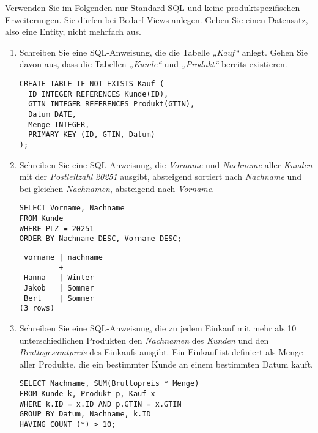 \documentclass{bschlangaul-aufgabe}
\begin{document}
Verwenden Sie im Folgenden nur Standard-SQL und keine
produktspezifischen Erweiterungen. Sie dürfen bei Bedarf Views anlegen.
Geben Sie einen Datensatz, also eine Entity, nicht mehrfach aus.

\begin{enumerate}


\item Schreiben Sie eine SQL-Anweisung, die die Tabelle \emph{„Kauf“}
anlegt. Gehen Sie davon aus, dass die Tabellen \emph{„Kunde“} und
\emph{„Produkt“} bereits existieren.

\begin{liAntwort}
\begin{verbatim}
CREATE TABLE IF NOT EXISTS Kauf (
  ID INTEGER REFERENCES Kunde(ID),
  GTIN INTEGER REFERENCES Produkt(GTIN),
  Datum DATE,
  Menge INTEGER,
  PRIMARY KEY (ID, GTIN, Datum)
);
\end{verbatim}
\end{liAntwort}


\item Schreiben Sie eine SQL-Anweisung, die \emph{Vorname} und
\emph{Nachname} aller \emph{Kunden} mit der \emph{Postleitzahl}
\emph{20251} ausgibt, absteigend sortiert nach \emph{Nachname} und bei
gleichen \emph{Nachnamen}, absteigend nach \emph{Vorname}.

\begin{liAntwort}
\begin{verbatim}
SELECT Vorname, Nachname
FROM Kunde
WHERE PLZ = 20251
ORDER BY Nachname DESC, Vorname DESC;
\end{verbatim}

\begin{verbatim}
 vorname | nachname
---------+----------
 Hanna   | Winter
 Jakob   | Sommer
 Bert    | Sommer
(3 rows)
\end{verbatim}
\end{liAntwort}


\item Schreiben Sie eine SQL-Anweisung, die zu jedem Einkauf mit mehr
als 10 unterschiedlichen Produkten den \emph{Nachnamen} des
\emph{Kunden} und den \emph{Bruttogesamtpreis} des Einkaufs ausgibt. Ein
Einkauf ist definiert als Menge aller Produkte, die ein bestimmter Kunde
an einem bestimmten Datum kauft.

\begin{liAntwort}
\begin{verbatim}
SELECT Nachname, SUM(Bruttopreis * Menge)
FROM Kunde k, Produkt p, Kauf x
WHERE k.ID = x.ID AND p.GTIN = x.GTIN
GROUP BY Datum, Nachname, k.ID
HAVING COUNT (*) > 10;
\end{verbatim}


\end{liAntwort}
\end{enumerate}
\end{document}

